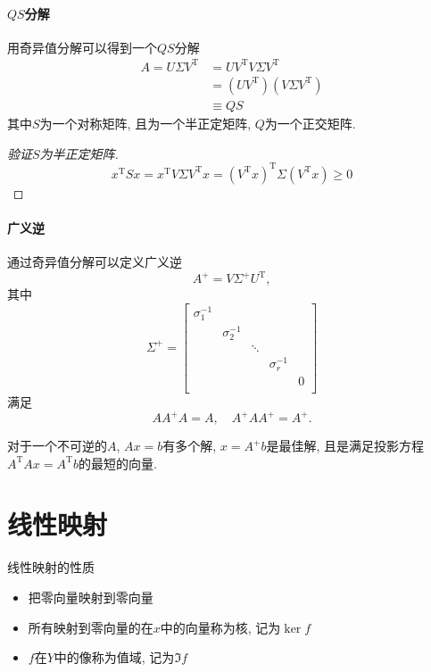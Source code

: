 \paragraph{$QS$分解}
用奇异值分解可以得到一个$QS$分解
\begin{equation}
    \begin{aligned}
        A = U\Sigma V^{\mathrm{T}} & = U V^{\mathrm{T}}V \Sigma V^{\mathrm{T}} 
        \\
        & =\left( U V^{\mathrm{T}} \right) \left( V\Sigma V^{\mathrm{T}} \right) 
        \\
        & \equiv QS
    \end{aligned}
\end{equation}
其中$S$为一个对称矩阵, 且为一个半正定矩阵, $Q$为一个正交矩阵.

\begin{proof}[验证$S$为半正定矩阵]
    \begin{equation}
      x^{\mathrm{T}} S x = x^{\mathrm{T}} V \Sigma V^{\mathrm{T}} x = \left( V^{\mathrm{T}} x \right) ^{\mathrm{T}} \Sigma \left( V^{\mathrm{T}} x \right) \ge 0
    \end{equation}
\end{proof}

\paragraph{广义逆}
通过奇异值分解可以定义广义逆
\begin{equation}
  A^{+} = V \Sigma^{+} U^{\mathrm{T}},
\end{equation}
其中
\begin{equation}
  \Sigma^{+} = \begin{bmatrix}
   \sigma_1^{-1} &  &  &  & \\
    & \sigma_2^{-1} &  &  & \\
    &  & \ddots &  & \\
    &  &  & \sigma_r^{-1} & \\
    &  &  &  & 0\\
    \end{bmatrix}
\end{equation}
满足
\begin{equation}
    A A^{+} A = A, \quad A^{+} A A^{+} = A^{+}.
\end{equation}

对于一个不可逆的$A$, $Ax = b$有多个解, $x = A^{+}b$是最佳解, 且是满足投影方程$A^{\mathrm{T}}A x = A^{\mathrm{T}} b$的最短的向量.

\section{线性映射}
线性映射的性质
\begin{itemize}
    \item 把零向量映射到零向量
    \item 所有映射到零向量的在$x$中的向量称为核, 记为$\ker f$
    \item $f$在$Y$中的像称为值域, 记为$\Im f$
\end{itemize}